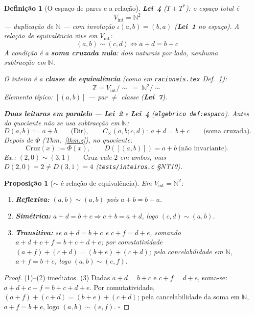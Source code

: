\documentclass[11pt,a4paper]{article}
\newtheorem{proposicao}[teorema]{Proposição}
\newtheorem{definicao}{Definição}
\newcommand{\code}[1]{\texttt{\small #1}}
\begin{document}
\begin{definicao}[O espaço de pares e a relação]\label{def:espaco}
\textbf{Lei~4} ($T+T^{*}$): o espaço total é
\[
\boxed{\;V_{\mathrm{int}}=\mathbb{N}^{2}\;}
\]
--- duplicação de $\mathbb{N}$ --- com involução $\iota(a,b)=(b,a)$
(\textbf{Lei~1} no espaço). A relação de equivalência vive em $V_{\mathrm{int}}$:
\[
\boxed{\;(a,b)\sim(c,d)\iff a+d=b+c\;}
\]
A condição é a \textbf{soma cruzada nula}: dois naturais por lado, nenhuma
subtracção em $\mathbb{N}$.

\medskip\noindent
O inteiro é a \textbf{classe de equivalência} (como em
\code{racionais.tex} Def.~\ref{def:espaco}):
\[
\boxed{\;
\mathbb{Z}=V_{\mathrm{int}}/{\sim}
\;=\;\mathbb{N}^{2}/{\sim}\;}
\]
Elemento típico: $[(a,b)]$ --- par $\neq$ classe (\textbf{Lei~7}).

\medskip\noindent
\textbf{Duas leituras em paralelo} --- \textbf{Lei~2} e \textbf{Lei~4}
(\code{algebrico def:espaco}). \emph{Antes} do quociente não se usa
subtracção em $\mathbb{N}$:
\[
D(a,b):=a+b\qquad\text{(Dir)},\qquad
C_{\times}(a,b;c,d):\ a+d=b+c\qquad\text{(soma cruzada)}.
\]
Depois de $\Phi$ (Thm.~\ref{thm:z}), no quociente:
\[
\boxed{\;\mathrm{Cruz}(x):=\Phi(x),\qquad
D([(a,b)])=a+b\ \text{(não invariante)}.\;}
\]
Ex.: $(2,0)\sim(3,1)$ --- $\mathrm{Cruz}$ vale $2$ em ambos, mas
$D(2,0)=2\neq D(3,1)=4$ (\code{tests/inteiros.c} §NT10).
\end{definicao}

\begin{proposicao}[$\sim$ é relação de equivalência]\label{prop:equiv}
Em $V_{\mathrm{int}}=\mathbb{N}^{2}$:
\begin{enumerate}\itemsep2pt
\item \textbf{Reflexiva:} $(a,b)\sim(a,b)$ pois $a+b=b+a$.
\item \textbf{Simétrica:} $a+d=b+c\Rightarrow c+b=a+d$, logo $(c,d)\sim(a,b)$.
\item \textbf{Transitiva:} se $a+d=b+c$ e $c+f=d+e$, somando
      $a+d+c+f=b+c+d+e$; por comutatividade
      $(a+f)+(c+d)=(b+e)+(c+d)$; pela cancelabilidade em $\mathbb{N}$,
      $a+f=b+e$, logo $(a,b)\sim(e,f)$.
\end{enumerate}
\end{proposicao}

\begin{proof}
(1)--(2) imediatos. (3) Dadas $a+d=b+c$ e $c+f=d+e$, soma-se:
$a+d+c+f=b+c+d+e$. Por comutatividade,
$(a+f)+(c+d)=(b+e)+(c+d)$; pela cancelabilidade da soma em $\mathbb{N}$,
$a+f=b+e$, logo $(a,b)\sim(e,f)$. $\square$
\end{proof}
\end{document}
